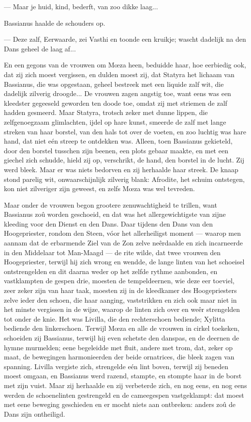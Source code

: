 \documentclass[a4paper, 12pt, oneside, dutch]{article}
\begin{document}
--- Maar je huid, kind, bederft, van zoo dikke laag...

Bassianus haalde de schouders op.

--- Deze zalf, Eerwaarde, zei Vasthi en toonde een kruikje; wascht dadelijk na den Dans geheel de laag af...

En een gegons van de vrouwen om Mœza heen, beduidde haar, hoe eerbiedig ook, dat zij zich moest vergissen, en dulden moest zij, dat Statyra het lichaam van Bassianus, die was opgestaan, geheel bestreek met een liquide zalf wit, die dadelijk zilverig droogde... De vrouwen zagen angstig toe, want eens was een kleedster gegeeseld geworden ten doode toe, omdat zij met striemen de zalf hadden gesmeerd. Maar Statyra, trotsch zeker met dunne lippen, die zelfgenoegzaam glimlachten, ijdel op hare kunst, smeerde de zalf met lange streken van haar borstel, van den hals tot over de voeten, en zoo luchtig was hare hand, dat niet eén streep te ontdekken was. Alleen, toen Bassianus gekieteld, door den borstel tusschen zijn beenen, een plots gebaar maakte, en met een giechel zich schudde, hield zij op, verschrikt, de hand, den borstel in de lucht. Zij werd bleek. Maar er was niets bedorven en zij herhaalde haar streek. De knaap stond parelig wit, onwaarschijnlijk zilverig blank: Afrodite, het schuim ontstegen, kon niet zilveriger zijn geweest, en zelfs Mœza was wel tevreden.

Maar onder de vrouwen begon grootere zenuwachtigheid te trillen, want Bassianus zoû worden geschoeid, en dat was het allergewichtigste van zijne kleeding voor den Dienst en den Dans. Daar tijdens den Dans van den Hoogepriester, rondom den Steen, vóor het allerheiligst moment --- waarop men aannam dat de erbarmende Ziel van de Zon zelve neêrdaalde en zich incarneerde in den Middelaar tot Man-Maagd --- de rite wilde, dat twee vrouwen den Hoogepriester, terwijl hij zich wrong en wendde, de lange linten van het schoeisel ontstrengelden en dit daarna weder op het zelfde rythme aanbonden, en vastklampten de gespen drie, moesten de tempeldeernen, wie deze eer toeviel, zeer zeker zijn van haar taak, moesten zij in de kleedkamer des Hoogepriesters zelve ieder den schoen, die haar aanging, vaststrikken en zich ook maar niet in het minste vergissen in de wijze, waarop de linten zich over en weêr strengelden tot onder de knie. Het was Livilla, die den rechterschoen bediende; Xylitta bediende den linkerschoen. Terwijl Mœza en alle de vrouwen in cirkel toekeken, schoeiden zij Bassianus, terwijl hij even schetste den danspas, en de deernen de hymne murmelden; eene begeleidde met fluit, andere met trom, dat, zeker op maat, de bewegingen harmonieerden der beide ornatrices, die bleek zagen van spanning. Livilla vergiste zich, strengelde eén lint boven, terwijl zij beneden moest omgaan, en Bassianus werd razend, stampte, en stompte haar in de borst met zijn vuist. Maar zij herhaalde en zij verbeterde zich, en nog eens, en nog eens werden de schoenelinten gestrengeld en de cameegespen vastgeklampt: dat moest met eene beweging geschieden en er mocht niets aan ontbreken: anders zoû de Dans zijn ontheiligd.
\end{document}
